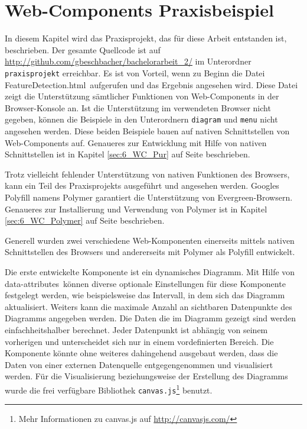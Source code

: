 \section{Web-Components Praxisbeispiel}
\label{sec:6_Web_Components_Praxis}

In diesem Kapitel wird das Praxisprojekt, das für diese Arbeit entstanden ist, beschrieben. Der gesamte Quellcode ist auf \url{http://github.com/gbeschbacher/bachelorarbeit_2/} im Unterordner \lstinline|praxisprojekt| erreichbar. Es ist von Vorteil, wenn zu Beginn die Datei \glqq FeatureDetection.html\grqq\ aufgerufen und das Ergebnis angesehen wird. Diese Datei zeigt die Unterstützung sämtlicher Funktionen von Web-Components in der Browser-Konsole an. Ist die Unterstützung im verwendeten Browser nicht gegeben, können die Beispiele in den Unterordnern \lstinline|diagram| und \lstinline|menu| nicht angesehen werden. Diese beiden Beispiele bauen auf nativen Schnittstellen von Web-Components auf. Genaueres zur Entwicklung mit Hilfe von nativen Schnittstellen ist in Kapitel \ref{sec:6_WC_Pur} auf Seite \pageref{sec:6_WC_Pur} beschrieben.

Trotz vielleicht fehlender Unterstützung von nativen Funktionen des Browsers, kann ein Teil des Praxisprojekts ausgeführt und angesehen werden. Googles Polyfill namens Polymer garantiert die Unterstützung von \glqq Evergreen\grqq -Browsern. Genaueres zur Installierung und Verwendung von Polymer ist in Kapitel \ref{sec:6_WC_Polymer} auf Seite \pageref{sec:6_WC_Polymer} beschrieben.

Generell wurden zwei verschiedene Web-Komponenten einerseits mittels nativen Schnittstellen des Browsers und andererseits mit Polymer als Polyfill entwickelt.

Die erste entwickelte Komponente ist ein dynamisches Diagramm. Mit Hilfe von \glqq data-attributes\grqq\ können diverse optionale Einstellungen für diese Komponente festgelegt werden, wie beispielsweise das Intervall, in dem sich das Diagramm aktualisiert. Weiters kann die maximale Anzahl an sichtbaren Datenpunkte des Diagramms angegeben werden. Die Daten die im Diagramm gezeigt sind werden einfachheitshalber berechnet. Jeder Datenpunkt ist abhängig von seinem vorherigen und unterscheidet sich nur in einem vordefinierten Bereich. Die Komponente könnte ohne weiteres dahingehend ausgebaut werden, dass die Daten von einer externen Datenquelle entgegengenommen und visualisiert werden. Für die Visualisierung beziehungsweise der Erstellung des Diagramms wurde die frei verfügbare Bibliothek \lstinline|canvas.js|\footnote{Mehr Informationen zu canvas.js auf \href{http://canvasjs.com/}{http://canvasjs.com/}} benutzt.


